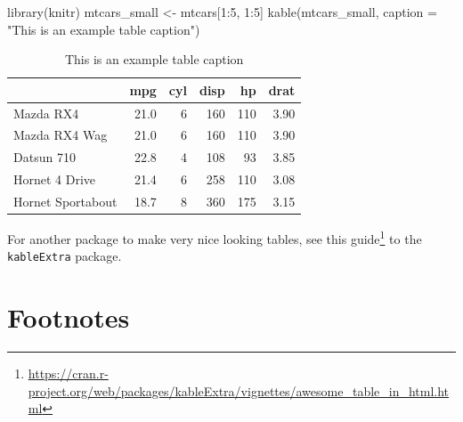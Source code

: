 \documentclass[
]{krantz}
\makeatletter
\newenvironment{Shaded}{\begin{snugshade}}{\end{snugshade}}
\newcommand{\AttributeTok}[1]{\textcolor[rgb]{0.61,0.61,0.61}{#1}}
\newcommand{\DecValTok}[1]{\textcolor[rgb]{0.06,0.06,0.06}{#1}}
\newcommand{\FunctionTok}[1]{\textcolor[rgb]{0,0,0}{#1}}
\newcommand{\NormalTok}[1]{#1}
\newcommand{\OtherTok}[1]{\textcolor[rgb]{0.37,0.37,0.37}{#1}}
\newcommand{\SpecialCharTok}[1]{\textcolor[rgb]{0,0,0}{#1}}
\newcommand{\StringTok}[1]{\textcolor[rgb]{0.5,0.5,0.5}{#1}}
\renewcommand{\href}[2]{#2\footnote{\url{#1}}}
\newenvironment{kframe}{%
\medskip{}
\setlength{\fboxsep}{.8em}
 \def\at@end@of@kframe{}%
 \ifinner\ifhmode%
  \def\at@end@of@kframe{\end{minipage}}%
  \begin{minipage}{\columnwidth}%
 \fi\fi%
 \def\FrameCommand##1{\hskip\@totalleftmargin \hskip-\fboxsep
 \colorbox{shadecolor}{##1}\hskip-\fboxsep
     \hskip-\linewidth \hskip-\@totalleftmargin \hskip\columnwidth}%
 \MakeFramed {\advance\hsize-\width
   \@totalleftmargin\z@ \linewidth\hsize
   \@setminipage}}%
 {\par\unskip\endMakeFramed%
 \at@end@of@kframe}
\renewenvironment{Shaded}{\begin{kframe}}{\end{kframe}}
\makeatother
\begin{document}
\begin{Shaded}
\begin{Highlighting}[]
\FunctionTok{library}\NormalTok{(knitr)}
\NormalTok{mtcars\_small }\OtherTok{\textless{}{-}}\NormalTok{ mtcars[}\DecValTok{1}\SpecialCharTok{:}\DecValTok{5}\NormalTok{, }\DecValTok{1}\SpecialCharTok{:}\DecValTok{5}\NormalTok{]}
\FunctionTok{kable}\NormalTok{(mtcars\_small, }\AttributeTok{caption =} \StringTok{"This is an example table caption"}\NormalTok{)}
\end{Highlighting}
\end{Shaded}

\begin{table}

\caption{\label{tab:unnamed-chunk-8}This is an example table caption}
\centering
\begin{tabular}[t]{l|r|r|r|r|r}
\hline
  & mpg & cyl & disp & hp & drat\\
\hline
Mazda RX4 & 21.0 & 6 & 160 & 110 & 3.90\\
\hline
Mazda RX4 Wag & 21.0 & 6 & 160 & 110 & 3.90\\
\hline
Datsun 710 & 22.8 & 4 & 108 & 93 & 3.85\\
\hline
Hornet 4 Drive & 21.4 & 6 & 258 & 110 & 3.08\\
\hline
Hornet Sportabout & 18.7 & 8 & 360 & 175 & 3.15\\
\hline
\end{tabular}
\end{table}

For another package to make very nice looking tables, see \href{https://cran.r-project.org/web/packages/kableExtra/vignettes/awesome_table_in_html.html}{this guide} to the \texttt{kableExtra} package.

\hypertarget{footnotes}{%
\section{Footnotes}\label{footnotes}}
\end{document}
